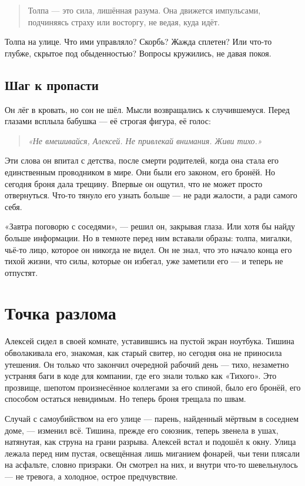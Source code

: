 \documentclass[12pt,a4paper]{book}
\newenvironment{innerthought}{\begin{quote}\small\itshape}{\end{quote}}
\begin{document}
\begin{quote}
Толпа --- это сила, лишённая разума. Она движется импульсами, подчиняясь страху или восторгу, не ведая, куда идёт.
\end{quote}

Толпа на улице. Что ими управляло? Скорбь? Жажда сплетен? Или что-то глубже, скрытое под обыденностью? Вопросы кружились, не давая покоя.

\section{Шаг к пропасти}

Он лёг в кровать, но сон не шёл. Мысли возвращались к случившемуся. Перед глазами всплыла бабушка --- её строгая фигура, её голос:

\begin{innerthought}
«Не вмешивайся, Алексей. Не привлекай внимания. Живи тихо.»
\end{innerthought}

Эти слова он впитал с детства, после смерти родителей, когда она стала его единственным проводником в мире. Они были его законом, его бронёй. Но сегодня броня дала трещину. Впервые он ощутил, что не может просто отвернуться. Что-то тянуло его узнать больше --- не ради жалости, а ради самого себя.

«Завтра поговорю с соседями», --- решил он, закрывая глаза. Или хотя бы найду больше информации. Но в темноте перед ним вставали образы: толпа, мигалки, чьё-то лицо, которое он никогда не видел. Он не знал, что это начало конца его тихой жизни, что силы, которые он избегал, уже заметили его --- и теперь не отпустят.

\chapter{Точка разлома}

Алексей сидел в своей комнате, уставившись на пустой экран ноутбука. Тишина обволакивала его, знакомая, как старый свитер, но сегодня она не приносила утешения. Он только что закончил очередной рабочий день --- тихо, незаметно устраняя баги в коде для компании, где его знали только как «Тихого». Это прозвище, шепотом произнесённое коллегами за его спиной, было его бронёй, его способом остаться невидимым. Но теперь броня трещала по швам.

Случай с самоубийством на его улице — парень, найденный мёртвым в соседнем доме, — изменил всё. Тишина, прежде его союзник, теперь звенела в ушах, натянутая, как струна на грани разрыва. Алексей встал и подошёл к окну. Улица лежала перед ним пустая, освещённая лишь миганием фонарей, чьи тени плясали на асфальте, словно призраки. Он смотрел на них, и внутри что-то шевельнулось — не тревога, а холодное, острое предчувствие.
\end{document}

